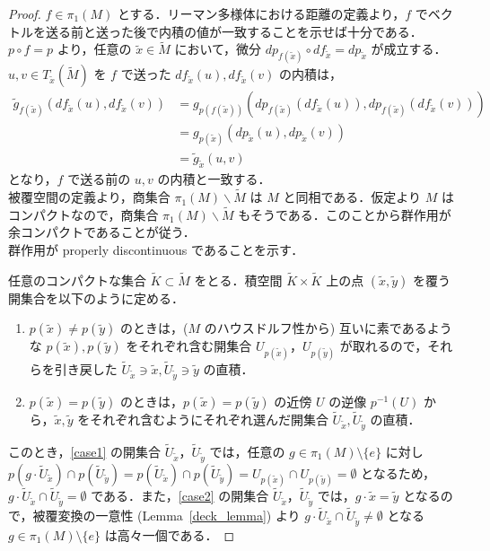 \documentclass[dvipdfmx]{ujarticle}
\theoremstyle{definition}
\begin{document}
\begin{proof}
$f\in\pi_1(M)$ とする．リーマン多様体における距離の定義より，$f$ でベクトルを送る前と送った後で内積の値が一致することを示せば十分である． $p\circ f=p$ より，任意の $\tilde{x}\in\widetilde{M}$ において，微分 $dp_{f(\tilde{x})}\circ df_{\tilde{x}}=dp_{\tilde{x}}$ が成立する．$u,v\in T_{\tilde{x}}(\widetilde{M})$ を $f$ で送った $df_{\tilde{x}}(u),df_{\tilde{x}}(v)$ の内積は，
\begin{align*}
  \tilde{g}_{f(\tilde{x})}(df_{\tilde{x}}(u),df_{\tilde{x}}(v))&=g_{p(f(\tilde{x}))}(dp_{f(\tilde{x})}(df_{\tilde{x}}(u)),dp_{f(\tilde{x})}(df_{\tilde{x}}(v)))\\
  &=g_{p(\tilde{x})}(dp_{\tilde{x}}(u),dp_{\tilde{x}}(v))\\
  &=\tilde{g}_{\tilde{x}}(u,v)
\end{align*}
となり，$f$ で送る前の $u,v$ の内積と一致する．\\

\noindent
被覆空間の定義より，商集合 $\pi_1(M)\backslash \widetilde{M}$ は $M$ と同相である．仮定より $M$ はコンパクトなので，商集合 $\pi_1(M)\backslash \widetilde{M}$ もそうである．このことから群作用が余コンパクトであることが従う．\\

\noindent
群作用が properly discontinuous であることを示す．

任意のコンパクトな集合 $\widetilde{K}\subset\widetilde{M}$ をとる．積空間 $\widetilde{K}\times\widetilde{K}$ 上の点 $(\tilde{x},\tilde{y})$ を覆う開集合を以下のように定める．
\begin{enumerate}
  \item $p(\tilde{x})\neq p(\tilde{y})$ のときは，($M$ のハウスドルフ性から) 互いに素であるような $p(\tilde{x}),p(\tilde{y})$ をそれぞれ含む開集合 $U_{p(\tilde{x})}$，$U_{p(\tilde{y})}$ が取れるので，それらを引き戻した $\widetilde{U}_{\tilde{x}}\ni \tilde{x},\widetilde{U}_{\tilde{y}}\ni \tilde{y}$ の直積．\label{case1}
  \item $p(\tilde{x})= p(\tilde{y})$ のときは，$p(\tilde{x})=p(\tilde{y})$ の近傍 $U$ の逆像 $p^{-1}(U)$ から，$\tilde{x},\tilde{y}$ をそれぞれ含むようにそれぞれ選んだ開集合 $\widetilde{U}_{\tilde{x}},\widetilde{U}_{\tilde{y}}$ の直積．\label{case2}
\end{enumerate}

このとき，\eqref{case1} の開集合 $\widetilde{U}_{\tilde{x}}$，$\widetilde{U}_{\tilde{y}}$ では，任意の $g\in\pi_1(M)\setminus \{e\}$ に対し $p(g\cdot\widetilde{U}_{\tilde{x}})\cap p(\widetilde{U}_{\tilde{y}})=p(\widetilde{U}_{\tilde{x}})\cap p(\widetilde{U}_{\tilde{y}})=U_{p(\tilde{x})}\cap U_{p(\tilde{y})}=\emptyset$ となるため， $g\cdot\widetilde{U}_{\tilde{x}}\cap \widetilde{U}_{\tilde{y}}=\emptyset$ である．また，\eqref{case2} の開集合 $\widetilde{U}_{\tilde{x}}$，$\widetilde{U}_{\tilde{y}}$ では，$g\cdot\tilde{x}=\tilde{y}$ となるので，被覆変換の一意性 (Lemma~\ref{deck_lemma}) より $g\cdot\widetilde{U}_{\tilde{x}}\cap \widetilde{U}_{\tilde{y}}\neq\emptyset$ となる $g\in\pi_1(M)\setminus\{e\}$ は高々一個である．


\end{proof}
\end{document}

